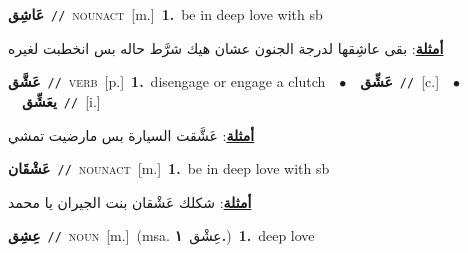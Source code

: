 \documentclass[10pt,a4paper,twoside]{article} %
\begin{document}
\begin{multicols}{2}
{\setlength\topsep{0pt}\textbf{\foreignlanguage{arabic}{عَاشِق}}\ {\color{gray}\texttt{//}\color{black}}\ \textsc{noun\textunderscore act}\ [m.]\ \textbf{1.}~be in deep love with sb\  \begin{flushright}\color{gray}\foreignlanguage{arabic}{\textbf{\underline{\foreignlanguage{arabic}{أمثلة}}}: بقى عاشِقها لدرجة الجنون عشان هيك شرَّط حاله بس انخطبت لغيره}\end{flushright}\color{black}} \vspace{2mm}

{\setlength\topsep{0pt}\textbf{\foreignlanguage{arabic}{عَشَّق}}\ {\color{gray}\texttt{//}\color{black}}\ \textsc{verb}\ [p.]\ \textbf{1.}~disengage or engage a clutch\ \ $\bullet$\ \ \setlength\topsep{0pt}\textbf{\foreignlanguage{arabic}{عَشِّق}}\ {\color{gray}\texttt{//}\color{black}}\ [c.]\ \ $\bullet$\ \ \setlength\topsep{0pt}\textbf{\foreignlanguage{arabic}{يعَشِّق}}\ {\color{gray}\texttt{//}\color{black}}\ [i.]\  \begin{flushright}\color{gray}\foreignlanguage{arabic}{\textbf{\underline{\foreignlanguage{arabic}{أمثلة}}}: عَشَّقت السيارة بس مارضيت تمشي}\end{flushright}\color{black}} \vspace{2mm}

{\setlength\topsep{0pt}\textbf{\foreignlanguage{arabic}{عَشْقَان}}\ {\color{gray}\texttt{//}\color{black}}\ \textsc{noun\textunderscore act}\ [m.]\ \textbf{1.}~be in deep love with sb\  \begin{flushright}\color{gray}\foreignlanguage{arabic}{\textbf{\underline{\foreignlanguage{arabic}{أمثلة}}}: شكلك عَشْقان بنت الجيران يا محمد}\end{flushright}\color{black}} \vspace{2mm}

{\setlength\topsep{0pt}\textbf{\foreignlanguage{arabic}{عِشِق}}\ {\color{gray}\texttt{//}\color{black}}\ \textsc{noun}\ [m.]\ \color{gray}(msa. \foreignlanguage{arabic}{عِشْق}~\foreignlanguage{arabic}{\textbf{١.}})\color{black}\ \textbf{1.}~deep love\ } \vspace{2mm}


\end{multicols}
\end{document}

